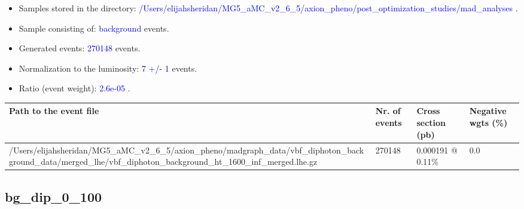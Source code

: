 \documentclass[a4paper, 10pt]{article}
\begin{document}
\begin{itemize}
  \item Samples stored in the directory: \textcolor{blue}{/\-Users/\-elijahsheridan/\-MG5\_aMC\_v2\_6\_5/\-axion\_pheno/\-post\_optimization\_studies/\-mad\_analyses} .
   \item Sample consisting of: \textcolor{blue}{background}  events.
   \item Generated events: \textcolor{blue}{270148 }  events.
   \item Normalization to the luminosity: \textcolor{blue}{7}\textcolor{blue}{ +/\-- }\textcolor{blue}{1 }  events.
   \item Ratio (event weight): \textcolor{blue}{2.6e-05 } .  
 
\end{itemize}
\begin{table}[H]
  \begin{center}
    \begin{tabular}{|m{55.0mm}|m{25.0mm}|m{30.0mm}|m{30.0mm}|}
      \hline
      {\cellcolor{yellow}         Path to the event file}& {\cellcolor{yellow}         Nr. of events}& {\cellcolor{yellow}         Cross section (pb)}& {\cellcolor{yellow}         Negative wgts (\%)}\\
      \hline
      {\cellcolor{white}          /\-Users/\-elijahsheridan/\-MG5\_aMC\_v2\_6\_5/\-axion\_pheno/\-madgraph\_data/\-vbf\_diphoton\_background\_data/\-merged\_lhe/\-vbf\_diphoton\_background\_ht\_1600\_inf\_merged.lhe.gz}& {\cellcolor{white}          270148}& {\cellcolor{white}          0.000191 @ 0.11\%}& {\cellcolor{white}          0.0}\\
\hline
    \end{tabular}
  \end{center}
\end{table}

\subsection{ bg\_dip\_0\_100}
\end{document}
